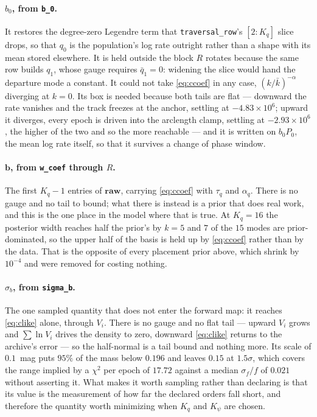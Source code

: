 \documentclass[11pt]{article}
\newcommand{\code}[1]{\texttt{#1}}
\begin{document}
\paragraph{$b_{0}$, from \code{b\_0}.} It restores the degree-zero Legendre term that
\code{traversal\_row}'s $[2\!:\!K_{q}]$ slice drops, so that $q_{0}$ is the population's log
rate outright rather than a shape with its mean stored elsewhere. It is held outside the
block $R$ rotates because the same row builds $q_{1}$, whose gauge requires
$\bar q_{1} = 0$: widening the slice would hand the departure mode a constant. It could not
take \eqref{eq:ccoef} in any case, $(k/\bar k)^{-\alpha}$ diverging at $k = 0$. Its box is
needed because both tails are flat --- downward the rate vanishes and the track freezes at
the anchor, settling at $-4.83\times10^{6}$; upward it diverges, every epoch is driven into
the arclength clamp, settling at $-2.93\times10^{6}$, the higher of the two and so the more
reachable --- and it is written on $b_{0}P_{0}$, the mean log rate itself, so that it
survives a change of phase window.

\paragraph{$\mathbf{b}$, from \code{w\_coef} through $R$.} The first $K_{q}-1$ entries of
$\mathbf{raw}$, carrying \eqref{eq:ccoef} with $\tau_{q}$ and $\alpha_{q}$. There is no
gauge and no tail to bound; what there is instead is a prior that does real work, and this
is the one place in the model where that is true. At $K_{q} = 16$ the posterior width
reaches half the prior's by $k = 5$ and $7$ of the $15$ modes are prior-dominated, so the
upper half of the basis is held up by \eqref{eq:ccoef} rather than by the data. That is the
opposite of every placement prior above, which shrink by $10^{-4}$ and were removed for
costing nothing.

\paragraph{$\sigma_{b}$, from \code{sigma\_b}.} The one sampled quantity that does not enter
the forward map: it reaches \eqref{eq:clike} alone, through $V_{i}$. There is no gauge and no
flat tail --- upward $V_{i}$ grows and $\sum\ln V_{i}$ drives the density to zero, downward
\eqref{eq:clike} returns to the archive's error --- so the half-normal is a tail bound and
nothing more. Its scale of $0.1$~mag puts $95\%$ of the mass below $0.196$ and leaves $0.15$
at $1.5\sigma$, which covers the range implied by a $\chi^{2}$ per epoch of $17.72$ against a
median $\sigma_{f}/f$ of $0.021$ without asserting it. What makes it worth sampling rather
than declaring is that its value is the measurement of how far the declared orders fall
short, and therefore the quantity worth minimizing when $K_{q}$ and $K_{\psi}$ are chosen.
\end{document}
